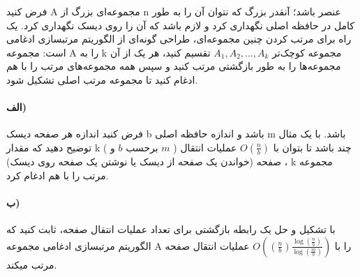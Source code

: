 \documentclass[]{article}
\begin{document}
فرض کنید A مجموعه‌ای بزرگ از n عنصر باشد؛
آنقدر بزرگ که نتوان آن را به طور کامل در حافظه اصلی نگهداری کرد و لازم باشد که آن را روی دیسک نگهداری کرد.
یک راه برای مرتب کردن چنین مجموعه‌ای، طراحی گونه‌ای از الگوریتم مرتبسازی ادغامی است:
مجموعه‌ A را به k مجموعه کوچک‌تر $A_1, A_2,\dots, A_k$ تقسیم کنید،
هر یک از آن مجموعه‌ها را به طور بازگشتی مرتب کنید و سپس همه مجموعه‌های مرتب را با هم ادغام کنید تا مجموعه مرتب اصلی تشکیل شود.



\paragraph[3.2]{الف)}
فرض کنید اندازه هر صفحه دیسک b باشد و اندازه حافظه اصلی m باشد.
با یک مثال توضیح دهید که مقدار k
( برحسب $b$ و $m$ )
چند باشد تا بتوان با
$O(\frac{n}{b})$ عملیات انتقال صفحه
(خواندن یک صفحه از دیسک یا نوشتن یک صفحه روی دیسک) ، k مجموعه مرتب را با هم ادغام کرد.

\paragraph[3.1]{ب)}
با تشکیل و حل یک رابطه بازگشتی برای تعداد عملیات انتقال صفحه، ثابت کنید که الگوریتم مرتبسازی ادغامی مجموعه A را با
$\displaystyle O((\frac{n}{b})\frac{\log(\frac{n}{b})}{\log(\frac{m}{b})})$
عملیات انتقال صفحه مرتب میکند.
\end{document}
